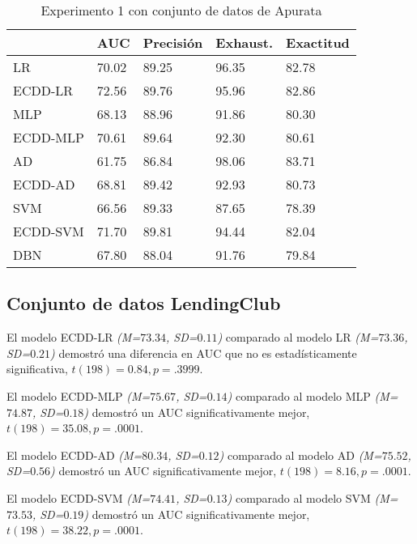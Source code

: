 \begin{table}[htbp]
\centering
\caption{Experimento 1 con conjunto de datos de Apurata}
\label{tab:apurata-proc1}
\begin{tabularx}{0.75\textwidth}{|l|Y Y Y Y|}
				\hline
				& AUC		& Precisión	& Exhaust.		& Exactitud	\\
				\hline
LR				& 70.02		& 89.25		& 96.35			& 82.78		\\		%
ECDD-LR			& 72.56		& 89.76		& 95.96			& 82.86		\\		%
				\hline
MLP				& 68.13		& 88.96		& 91.86			& 80.30		\\		%
ECDD-MLP		& 70.61		& 89.64		& 92.30			& 80.61		\\		%
				\hline
AD				& 61.75		& 86.84		& 98.06			& 83.71		\\		%
ECDD-AD			& 68.81		& 89.42		& 92.93			& 80.73		\\		%
				\hline
SVM				& 66.56		& 89.33		& 87.65			& 78.39		\\		%
ECDD-SVM		& 71.70		& 89.81		& 94.44			& 82.04		\\		%
				\hline
DBN				& 67.80		& 88.04		& 91.76			& 79.84		\\		%
				\hline
\end{tabularx}
\end{table}


\subsection{Conjunto de datos LendingClub}

El modelo ECDD-LR \textit{(M=$73.34$, SD=$0.11$)} comparado al modelo \ac{LR} \textit{(M=$73.36$, SD=$0.21$)} demostró una diferencia en \ac{AUC} que no es estadísticamente significativa, $t(198)=0.84, p=.3999$.

El modelo ECDD-MLP \textit{(M=$75.67$, SD=$0.14$)} comparado al modelo \ac{MLP} \textit{(M=$74.87$, SD=$0.18$)} demostró un \ac{AUC} significativamente mejor, $t(198)=35.08, p=.0001$.

El modelo ECDD-AD \textit{(M=$80.34$, SD=$0.12$)} comparado al modelo \ac{AD} \textit{(M=$75.52$, SD=$0.56$)} demostró un \ac{AUC} significativamente mejor, $t(198)=8.16, p=.0001$.

El modelo ECDD-SVM \textit{(M=$74.41$, SD=$0.13$)} comparado al modelo \ac{SVM} \textit{(M=$73.53$, SD=$0.19$)} demostró un \ac{AUC} significativamente mejor, $t(198)=38.22, p=.0001$.

